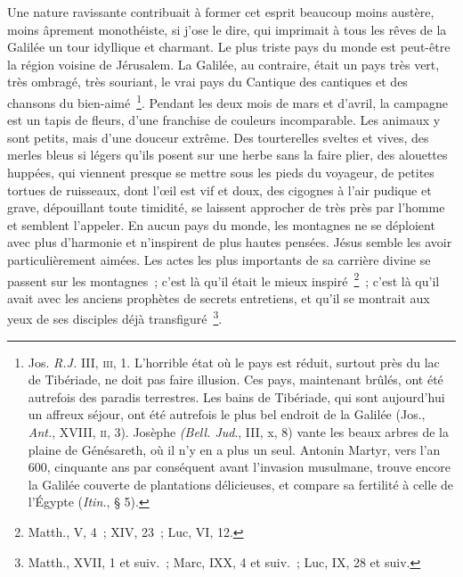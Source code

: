 \documentclass[french,twoside]{book} %
\begin{document}
Une nature ravissante contribuait à former cet esprit beaucoup moins austère, moins âprement monothéiste, si j’ose le dire, qui imprimait à tous les rêves de la Galilée un tour idyllique et charmant. Le plus triste pays du monde est peut-être la région voisine de Jérusalem. La Galilée, au contraire, était un pays très vert, très ombragé, très souriant, le vrai pays du Cantique des cantiques et des chansons du bien-aimé \footnote{ Jos. {\itshape R.J.} III, \textsc{iii}, 1. L’horrible état où le pays est réduit, surtout près du lac de Tibériade, ne doit pas faire illusion. Ces pays, maintenant brûlés, ont été autrefois des paradis terrestres. Les bains de Tibériade, qui sont aujourd’hui un affreux séjour, ont été autrefois le plus bel endroit de la Galilée (Jos., {\itshape Ant.}, XVIII, \textsc{ii}, 3). Josèphe {\itshape (Bell. Jud}., III, x, 8) vante les beaux arbres de la plaine de Génésareth, où il n’y en a plus un seul. Antonin Martyr, vers l’an 600, cinquante ans par conséquent avant l’invasion musulmane, trouve encore la Galilée couverte de plantations délicieuses, et compare sa fertilité à celle de l’Égypte ({\itshape Itin.}, § 5).}. Pendant les deux mois de mars et d’avril, la campagne est un tapis de fleurs, d’une franchise de couleurs incomparable. Les animaux y sont petits, mais d’une douceur extrême. Des tourterelles sveltes et vives, des merles bleus si légers qu’ils posent sur une herbe sans la faire plier, des alouettes huppées, qui viennent presque se mettre sous les pieds du voyageur, de petites tortues de ruisseaux, dont l’œil est vif et doux, des cigognes à l’air pudique et grave, dépouillant toute timidité, se laissent approcher de très près par l’homme et semblent l’appeler. En aucun pays du monde, les montagnes ne se déploient avec plus d’harmonie et n’inspirent de plus hautes pensées. Jésus semble les avoir particulièrement aimées. Les actes les plus importants de sa carrière divine se passent sur les montagnes ; c’est là qu’il était le mieux inspiré \footnote{Matth., V, 4 ; XIV, 23 ; Luc, VI, 12.} ; c’est là qu’il avait avec les anciens prophètes de secrets entretiens, et qu’il se montrait aux yeux de ses disciples déjà transfiguré \footnote{Matth., XVII, 1 et suiv. ; Marc, IXX, 4 et suiv. ; Luc, IX, 28 et suiv.}.\par
\end{document}
